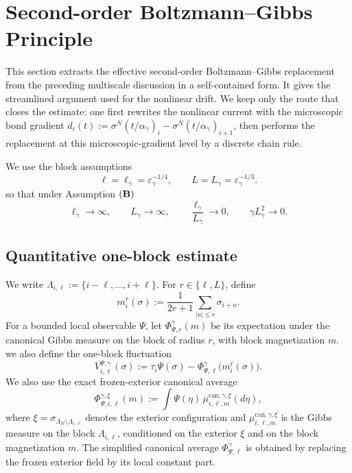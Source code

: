 \documentclass{article}
\begin{document}
\section{Second-order Boltzmann--Gibbs Principle}
\label{sec:clean-second-order-bg}

This section extracts the effective second-order Boltzmann--Gibbs replacement from the preceding multiscale discussion in a self-contained form.  It gives the
streamlined argument used for the nonlinear drift.  We keep only the route that closes the estimate: one first rewrites the nonlinear current with the microscopic bond gradient \( d_i(t):=\sigma^N(t/\alpha_\gamma)_{i}-\sigma^N(t/\alpha_\gamma)_{i+1}\), then performs the
replacement at this microscopic-gradient level by a discrete chain rule.

We use the block assumptions
\begin{equation}\label{ass:clean-bg-scales}
    \ell = \ell_\gamma=\varepsilon_\gamma^{-1/4},\qquad
L=L_\gamma=\varepsilon_\gamma^{-1/3}.
\end{equation}
so that under Assumption \(({\bf B})\)
\begin{equation}
\ell_\gamma\to\infty,\qquad L_\gamma\to\infty,\qquad
\frac{\ell_\gamma}{L_\gamma}\to0,\qquad
\gamma L_\gamma^2\to0.
\end{equation}

\subsection{Quantitative one-block estimate}
\label{subsec:quantitative-one-block}

We write
\(
\Lambda_{i,\ell}:=\{i-\ell,\dots,i+\ell\}.
\)
For \(r\in\{\ell, L\}\), define
\[
m_i^r(\sigma):=\frac{1}{2r+1}\sum_{|u|\le r}\sigma_{i+u}.
\]
For a bounded local observable \(\Psi\), let \(\Phi_{\Psi,r}^{\gamma}(m)\) be its expectation under the canonical Gibbs
measure on the block of radius \(r\), with block magnetization \(m\).
we also define the one-block fluctuation
\[
V_{i,\ell}^{\Psi,\gamma}(\sigma)
:=
\tau_i\Psi(\sigma)
-
\Phi_{\Psi,\ell}^{\gamma}\bigl(m_i^\ell(\sigma)\bigr).
\]
We also use the exact frozen-exterior canonical average
\[
\Phi_{\Psi,i,\ell}^{\gamma,\xi}(m)
:=
\int \Psi(\eta)\,
\mu_{i,\ell,m}^{\mathrm{can},\gamma,\xi}(d\eta),
\]
where \(\xi=\sigma_{\Lambda_N\setminus\Lambda_{i,\ell}}\) denotes the exterior
configuration and \(\mu_{i,\ell,m}^{\mathrm{can},\gamma,\xi}\) is the Gibbs
measure on the block \(\Lambda_{i,\ell}\), conditioned on the exterior
\(\xi\) and on the block magnetization \(m\).  The simplified canonical
average \(\Phi_{\Psi,\ell}^{\gamma}\) is obtained by replacing the frozen
exterior field by its local constant part.
\end{document}
